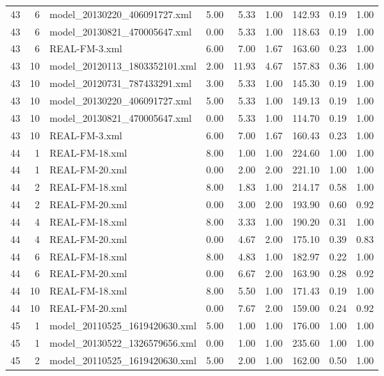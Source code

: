 \begin{table}[ht]
\begin{tabular}{rrlrrrrrr}
   43 &   6 & model\_20130220\_406091727.xml & 5.00 & 5.33 & 1.00 & 142.93 & 0.19 & 1.00 \\ 
   43 &   6 & model\_20130821\_470005647.xml & 0.00 & 5.33 & 1.00 & 118.63 & 0.19 & 1.00 \\ 
   43 &   6 & REAL-FM-3.xml & 6.00 & 7.00 & 1.67 & 163.60 & 0.23 & 1.00 \\ 
   43 &  10 & model\_20120113\_1803352101.xml & 2.00 & 11.93 & 4.67 & 157.83 & 0.36 & 1.00 \\ 
   43 &  10 & model\_20120731\_787433291.xml & 3.00 & 5.33 & 1.00 & 145.30 & 0.19 & 1.00 \\ 
   43 &  10 & model\_20130220\_406091727.xml & 5.00 & 5.33 & 1.00 & 149.13 & 0.19 & 1.00 \\ 
   43 &  10 & model\_20130821\_470005647.xml & 0.00 & 5.33 & 1.00 & 114.70 & 0.19 & 1.00 \\ 
   43 &  10 & REAL-FM-3.xml & 6.00 & 7.00 & 1.67 & 160.43 & 0.23 & 1.00 \\ 
   44 &   1 & REAL-FM-18.xml & 8.00 & 1.00 & 1.00 & 224.60 & 1.00 & 1.00 \\ 
   44 &   1 & REAL-FM-20.xml & 0.00 & 2.00 & 2.00 & 221.10 & 1.00 & 1.00 \\ 
   44 &   2 & REAL-FM-18.xml & 8.00 & 1.83 & 1.00 & 214.17 & 0.58 & 1.00 \\ 
   44 &   2 & REAL-FM-20.xml & 0.00 & 3.00 & 2.00 & 193.90 & 0.60 & 0.92 \\ 
   44 &   4 & REAL-FM-18.xml & 8.00 & 3.33 & 1.00 & 190.20 & 0.31 & 1.00 \\ 
   44 &   4 & REAL-FM-20.xml & 0.00 & 4.67 & 2.00 & 175.10 & 0.39 & 0.83 \\ 
   44 &   6 & REAL-FM-18.xml & 8.00 & 4.83 & 1.00 & 182.97 & 0.22 & 1.00 \\ 
   44 &   6 & REAL-FM-20.xml & 0.00 & 6.67 & 2.00 & 163.90 & 0.28 & 0.92 \\ 
   44 &  10 & REAL-FM-18.xml & 8.00 & 5.50 & 1.00 & 171.43 & 0.19 & 1.00 \\ 
   44 &  10 & REAL-FM-20.xml & 0.00 & 7.67 & 2.00 & 159.00 & 0.24 & 0.92 \\ 
   45 &   1 & model\_20110525\_1619420630.xml & 5.00 & 1.00 & 1.00 & 176.00 & 1.00 & 1.00 \\ 
   45 &   1 & model\_20130522\_1326579656.xml & 0.00 & 1.00 & 1.00 & 235.60 & 1.00 & 1.00 \\ 
   45 &   2 & model\_20110525\_1619420630.xml & 5.00 & 2.00 & 1.00 & 162.00 & 0.50 & 1.00 \\ 

\end{tabular}
\end{table}

